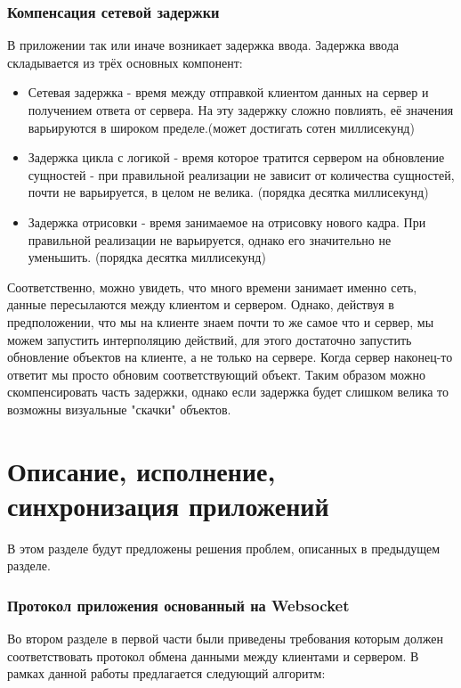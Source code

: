 \documentclass[a4paper,14pt, openany]{book}
\begin{document}
\subsection{Компенсация сетевой задержки}

В приложении так или иначе возникает задержка ввода. Задержка ввода складывается из трёх основных компонент:

\begin{itemize}
   \item Сетевая задержка - время между отправкой клиентом данных на сервер и получением ответа от сервера. На эту задержку сложно повлиять, её значения варьируются в широком пределе.(может достигать сотен миллисекунд)
   \item Задержка цикла с логикой - время которое тратится сервером на обновление сущностей - при правильной реализации не зависит от количества сущностей, почти не варьируется, в целом не велика. (порядка десятка миллисекунд)
   \item Задержка отрисовки - время занимаемое на отрисовку нового кадра. При правильной реализации не варьируется, однако его значительно не уменьшить. (порядка десятка миллисекунд)
\end{itemize}

Соответственно, можно увидеть, что много времени занимает именно сеть, данные пересылаются между клиентом и сервером. Однако, действуя в предположении, что мы на клиенте знаем почти то же самое что и сервер, мы можем запустить интерполяцию действий, для этого достаточно запустить обновление объектов на клиенте, а не только на сервере. Когда сервер наконец-то ответит мы просто обновим соответствующий объект. Таким образом можно скомпенсировать часть задержки, однако если задержка будет слишком велика то возможны визуальные "скачки" объектов. 

\chapter {Описание, исполнение, синхронизация приложений}

В этом разделе будут предложены решения проблем, описанных в предыдущем разделе. 

\subsection{Протокол приложения основанный на Websocket}

Во втором разделе в первой части были приведены требования которым должен соответствовать протокол обмена данными между клиентами и сервером. В рамках данной работы предлагается следующий алгоритм:
\end{document}

